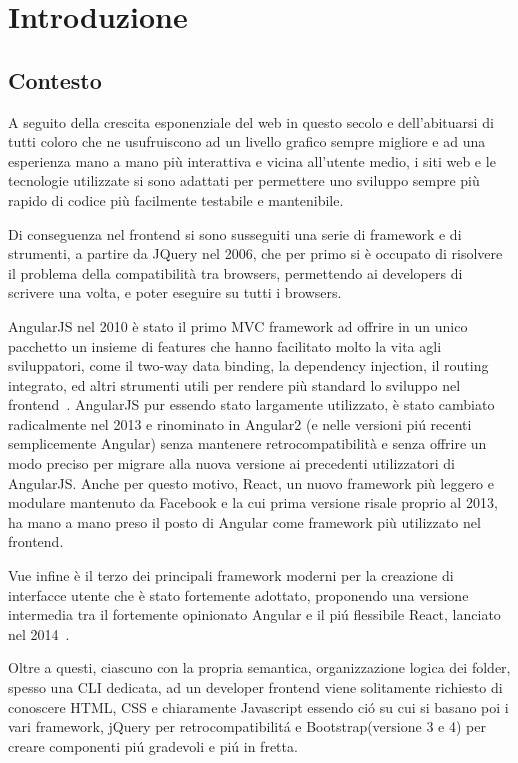 \chapter{Introduzione}\label{cap:introduzione}

\section{Contesto}\label{sez:contesto}

A seguito della crescita esponenziale del web in questo secolo e dell'abituarsi di tutti coloro che ne usufruiscono ad un livello grafico sempre migliore e ad una esperienza mano a mano pi\`u interattiva e vicina all'utente medio, i siti web e le tecnologie utilizzate si sono adattati per permettere uno sviluppo sempre pi\`u rapido di codice pi\`u facilmente testabile e mantenibile.

Di conseguenza nel frontend si sono susseguiti una serie di framework e di strumenti, a partire da JQuery\cite{jquery} nel 2006, che per primo si \`e occupato di risolvere il problema della compatibilit\`a tra browsers, permettendo ai developers di scrivere una volta, e poter eseguire su tutti i browsers.

AngularJS nel 2010 \`e stato il primo MVC framework ad offrire in un unico pacchetto un insieme di features che hanno facilitato molto la vita agli sviluppatori, come il two-way data binding, la dependency injection, il routing integrato, ed altri strumenti utili per rendere pi\`u standard lo sviluppo nel frontend~\cite{Hoff}.
AngularJS pur essendo stato largamente utilizzato, \`e stato cambiato radicalmente nel 2013 e rinominato in Angular2 (e nelle versioni pi\'u recenti semplicemente Angular) senza mantenere retrocompatibilit\`a e senza offrire un modo preciso per migrare alla nuova versione ai precedenti utilizzatori di AngularJS.
Anche per questo motivo, React, un nuovo framework pi\`u leggero e modulare mantenuto da Facebook e la cui prima versione risale proprio al 2013, ha mano a mano preso il posto di Angular come framework pi\`u utilizzato nel frontend.

Vue infine \`e il terzo dei principali framework moderni per la creazione di interfacce utente che \`e stato fortemente adottato, proponendo una versione intermedia tra il fortemente opinionato Angular e il pi\'u flessibile React, lanciato nel 2014~\cite{vueJs}.

Oltre a questi, ciascuno con la propria semantica, organizzazione logica dei folder, spesso una CLI dedicata, ad un developer frontend viene solitamente richiesto di conoscere HTML, CSS e chiaramente Javascript essendo ci\'o su cui si basano poi i vari framework, jQuery per retrocompatibilit\'a e Bootstrap(versione 3 e 4) per creare componenti pi\'u gradevoli e pi\'u in fretta.


